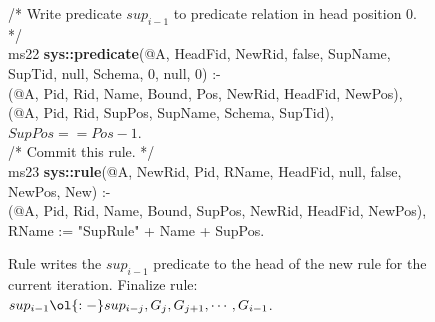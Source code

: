 \begin{figure}[!t]
\ssp
\centering
\begin{boxedminipage}{\linewidth}
/* Write predicate $sup_{i-1}$ to predicate relation in head position $0$. */ \\
ms22 {\bf sys::predicate}(@A, HeadFid, NewRid, false, SupName, SupTid, null, Schema, 0, null, 0) :- \\
(@A, Pid, Rid, Name, Bound, Pos, NewRid, HeadFid, NewPos), \\
(@A, Pid, Rid, SupPos, SupName, Schema, SupTid), \\
\datalogspace $SupPos == Pos - 1$. \\
  
/* Commit this rule. */ \\
ms23 {\bf sys::rule}(@A, NewRid, Pid, RName, HeadFid, null, false, NewPos, New) :- \\
(@A, Pid, Rid, Name, Bound, SupPos, NewRid, HeadFid, NewPos), \\
\datalogspace RName := "SupRule" + Name + SupPos. \\

\end{boxedminipage}
\caption{\label{ch:evita:fig:supiter} Rule writes the $sup_{i-1}$ predicate to the head 
of the new rule for the current iteration.
Finalize rule: $sup_{i-1} \ol{:-} sup_{i-j}, G_j, G_{j+1}, \cdots, G_{i-1}$.}
\end{figure}

